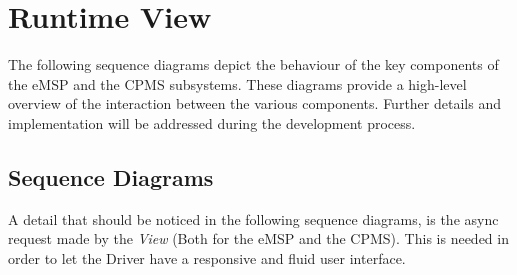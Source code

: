 \section{Runtime View}
\label{sec:runtimeView}
The following sequence diagrams depict the behaviour of the key components of the eMSP and the CPMS subsystems. These diagrams provide a high-level overview of the interaction between the various components. Further details and implementation will be addressed during the development process.
\subsection{Sequence Diagrams}
\label{subsec:sequenceDiagrams}
A detail that should be noticed in the following sequence diagrams, is the async request made by the \textit{View} (Both for the eMSP and the CPMS). This is needed in order to let the Driver have a responsive and fluid user interface. 
